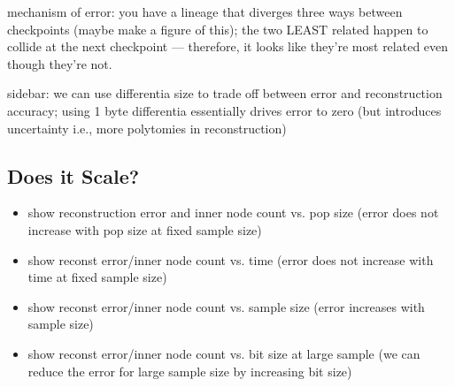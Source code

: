 mechanism of error: you have a lineage that diverges three ways between checkpoints (maybe make a figure of this); the two LEAST related happen to collide at the next checkpoint --- therefore, it looks like they're most related even though they're not.

sidebar: we can use differentia size to trade off between error and reconstruction accuracy; using 1 byte differentia essentially drives error to zero (but introduces uncertainty i.e., more polytomies in reconstruction)

\subsection{Does it Scale?} \label{sec:scaling}
\begin{itemize}
    \item show reconstruction error and inner node count vs. pop size (error does not increase with pop size at fixed sample size)
    \item show reconst error/inner node count vs. time (error does not increase with time at fixed sample size)
    \item show reconst error/inner node count vs. sample size (error increases with sample size)
    \item show reconst error/inner node count vs. bit size at large sample (we can reduce the error for large sample size by increasing bit size)
\end{itemize}
